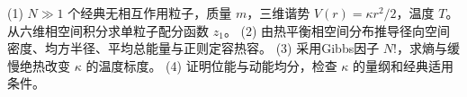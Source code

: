 (1) \(N\gg1\) 个经典无相互作用粒子，质量 \(m\)，三维谐势 \(V(r)=\kappa r^2/2\)，温度 \(T\)。从六维相空间积分求单粒子配分函数 \(z_1\)。
(2) 由热平衡相空间分布推导径向空间密度、均方半径、平均总能量与正则定容热容。
(3) 采用Gibbs因子 \(N!\)，求熵与缓慢绝热改变 \(\kappa\) 的温度标度。
(4) 证明位能与动能均分，检查 \(\kappa\) 的量纲和经典适用条件。
